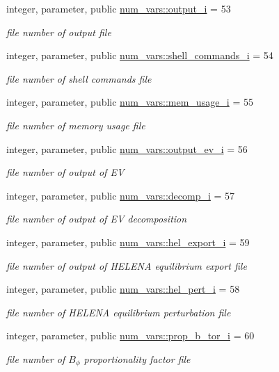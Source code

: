 \begin{DoxyCompactItemize}
integer, parameter, public \hyperlink{namespacenum__vars_aec5ffb30114a8af11226208844d12998}{num\+\_\+vars\+::output\+\_\+i} = 53
\begin{DoxyCompactList}\small\item\em file number of output file \end{DoxyCompactList}\item 
integer, parameter, public \hyperlink{namespacenum__vars_a2e139da75c6bcec4376b38d3ea1c5aa7}{num\+\_\+vars\+::shell\+\_\+commands\+\_\+i} = 54
\begin{DoxyCompactList}\small\item\em file number of shell commands file \end{DoxyCompactList}\item 
integer, parameter, public \hyperlink{namespacenum__vars_a606c68d407ec135c105f0501c224ea1b}{num\+\_\+vars\+::mem\+\_\+usage\+\_\+i} = 55
\begin{DoxyCompactList}\small\item\em file number of memory usage file \end{DoxyCompactList}\item 
integer, parameter, public \hyperlink{namespacenum__vars_a98774008e1bfbed335a89f813c7dcbde}{num\+\_\+vars\+::output\+\_\+ev\+\_\+i} = 56
\begin{DoxyCompactList}\small\item\em file number of output of EV \end{DoxyCompactList}\item 
integer, parameter, public \hyperlink{namespacenum__vars_a886394fc855acaa9a5e4ab5b3ce8c9d9}{num\+\_\+vars\+::decomp\+\_\+i} = 57
\begin{DoxyCompactList}\small\item\em file number of output of EV decomposition \end{DoxyCompactList}\item 
integer, parameter, public \hyperlink{namespacenum__vars_ac781aa60ad67117abaff9737745e53f1}{num\+\_\+vars\+::hel\+\_\+export\+\_\+i} = 59
\begin{DoxyCompactList}\small\item\em file number of output of H\+E\+L\+E\+NA equilibrium export file \end{DoxyCompactList}\item 
integer, parameter, public \hyperlink{namespacenum__vars_a85c70cc05010c9efdf37551d9ec852cb}{num\+\_\+vars\+::hel\+\_\+pert\+\_\+i} = 58
\begin{DoxyCompactList}\small\item\em file number of H\+E\+L\+E\+NA equilibrium perturbation file \end{DoxyCompactList}\item 
integer, parameter, public \hyperlink{namespacenum__vars_ad4a441f0ea4a8b93fd373a6c96c918e0}{num\+\_\+vars\+::prop\+\_\+b\+\_\+tor\+\_\+i} = 60
\begin{DoxyCompactList}\small\item\em file number of $B_\phi$ proportionality factor file \end{DoxyCompactList}\end{DoxyCompactItemize}

